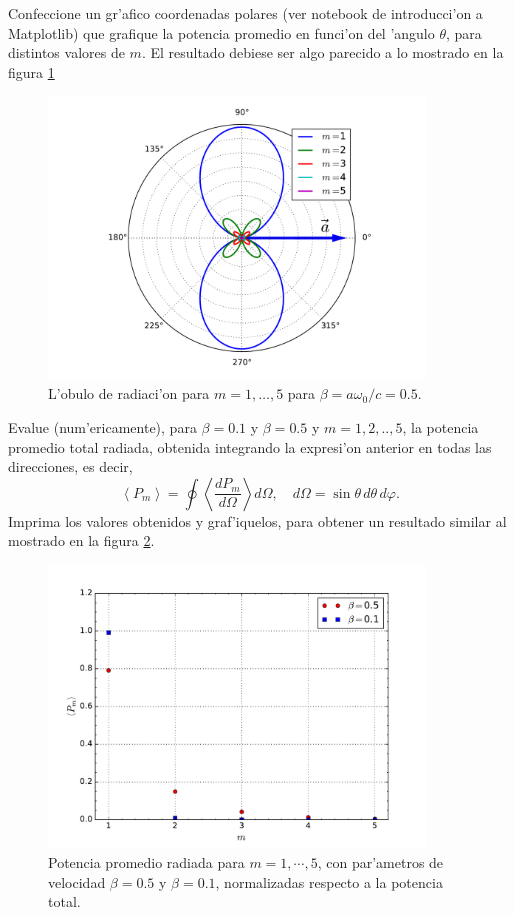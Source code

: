 \documentclass[11pt]{exam}
\begin{document}
\begin{parts}
\item Confeccione un gr'afico coordenadas polares (ver notebook de introducci'on a Matplotlib) que grafique la potencia promedio en funci'on del 'angulo $\theta$, para distintos valores de $m$. El resultado debiese ser algo parecido a lo mostrado en la figura \ref{TER2}
\begin{figure}[ht]
\centerline{\includegraphics[width=10cm]{figs/fig-mas.pdf}}
\caption{L'obulo de radiaci'on para $m=1,\dots,5$ para $\beta=a\omega_0/c=0.5$.}
\label{TER2}
\end{figure}
\item Evalue (num'ericamente), para $\beta =0.1$ y $\beta = 0.5$ y $m = 1,2,..,5$,  la potencia promedio total radiada, obtenida integrando la expresi'on anterior en todas las direcciones, es decir,
\begin{equation}
\left\langle P_{m}\right\rangle  = \oint\left\langle \frac{dP_{m}}{d\Omega}\right\rangle d\Omega, \quad d\Omega = \sin\theta\,d\theta\,d\varphi.
\end{equation}
Imprima los valores obtenidos y graf'iquelos, para obtener un resultado similar al mostrado en la figura \ref{TER3}.
\begin{figure}[ht]
\centerline{\includegraphics[width=10cm]{figs/fig-mas-potencia-total-comparacion.pdf}}
 \caption{Potencia promedio radiada para $m=1,\cdots,5$, con par'ametros de velocidad $\beta=0.5$ y  $\beta=0.1$, normalizadas respecto a la potencia total.}
\label{TER3}
\end{figure}
\end{parts}
\end{document}
